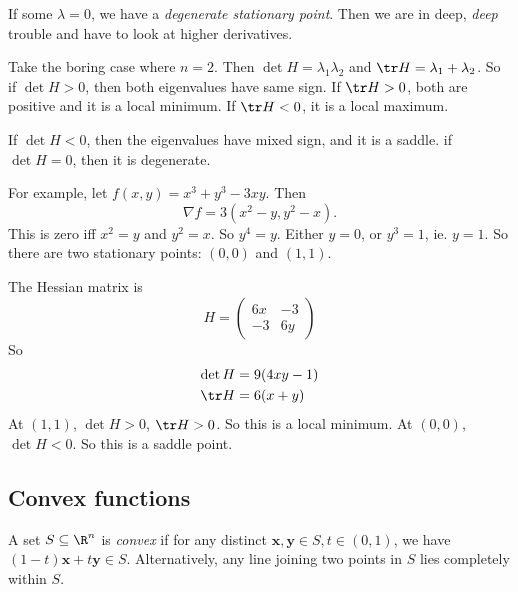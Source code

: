 \documentclass[a4paper]{article}
\begin{document}
If some $\lambda = 0$, we have a \emph{degenerate stationary point}. Then we are in deep, \emph{deep} trouble and have to look at higher derivatives.

\begin{eg}
  Take the boring case where $n = 2$. Then $\det H = \lambda_1 \lambda_2$ and $\tr H = \lambda_1 + \lambda_2$. So if $\det H > 0$, then both eigenvalues have same sign. If $\tr H > 0$, both are positive and it is a local minimum. If $\tr H < 0$, it is a local maximum.

  If $\det H < 0$, then the eigenvalues have mixed sign, and it is a saddle. if $\det H = 0$, then it is degenerate.

  For example, let $f(x, y) = x^3 + y^3 - 3xy$. Then
  \[
    \nabla f = 3(x^2 - y, y^2 - x).
  \]
  This is zero iff $x^2 = y$ and $y^2 = x$. So $y^4 = y$. Either $y = 0$, or $y^3 = 1$, ie. $y = 1$. So there are two stationary points: $(0, 0)$ and $(1, 1)$.

  The Hessian matrix is
  \[
    H = 
    \begin{pmatrix}
      6x & -3\\
      -3 & 6y
    \end{pmatrix}
  \]
  So
  \begin{align*}
    \det H &= 9(4xy - 1)\\
    \tr H &= 6(x + y)
  \end{align*}
  At $(1, 1)$, $\det H > 0$, $\tr H > 0$. So this is a local minimum. At $(0, 0)$, $\det H < 0$. So this is a saddle point.
\end{eg}
\subsection{Convex functions}
\begin{defi}
  A set $S\subseteq \R^n$ is \emph{convex} if for any distinct $\mathbf{x}, \mathbf{y}\in S, t\in (0, 1)$, we have $(1 - t)\mathbf{x} + t\mathbf{y} \in S$. Alternatively, any line joining two points in $S$ lies completely within $S$.

  \begin{center}
  \end{center}
\end{defi}
\end{document}
